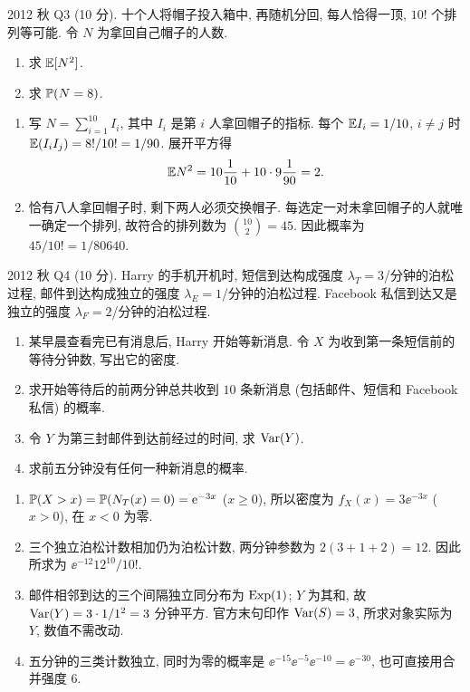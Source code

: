 \begin{exercise}\label{ex:fe2012q3}
2012 秋 Q3 (10 分). 十个人将帽子投入箱中, 再随机分回, 每人恰得一顶, $10!$ 个排列等可能. 令 $N$ 为拿回自己帽子的人数.
\begin{enumerate}[label=(\alph*)]
\item\label{ex:fe2012q3-a} 求 $\mathbb E[N^2]$.
\item\label{ex:fe2012q3-b} 求 $\mathbb P(N=8)$.
\end{enumerate}
\end{exercise}
\begin{solution}
\begin{enumerate}[label=(\alph*)]
\item\label{sol:fe2012q3-a} 写 $N=\sum_{i=1}^{10}I_i$, 其中 $I_i$ 是第 $i$ 人拿回帽子的指标. 每个 $\mathbb E I_i=1/10$, $i\ne j$ 时 $\mathbb E(I_iI_j)=8!/10!=1/90$. 展开平方得
\[
 \mathbb E N^2=10\frac1{10}+10\cdot9\frac1{90}=2.
\]
\item\label{sol:fe2012q3-b} 恰有八人拿回帽子时, 剩下两人必须交换帽子. 每选定一对未拿回帽子的人就唯一确定一个排列, 故符合的排列数为 $\binom{10}{2}=45$. 因此概率为 $45/10!=1/80640$.
\end{enumerate}
\end{solution}

\begin{exercise}\label{ex:fe2012q4}
2012 秋 Q4 (10 分). Harry 的手机开机时, 短信到达构成强度 $\lambda_T=3$/分钟的泊松过程, 邮件到达构成独立的强度 $\lambda_E=1$/分钟的泊松过程. Facebook 私信到达又是独立的强度 $\lambda_F=2$/分钟的泊松过程.
\begin{enumerate}[label=(\alph*)]
\item\label{ex:fe2012q4-a} 某早晨查看完已有消息后, Harry 开始等新消息. 令 $X$ 为收到第一条短信前的等待分钟数, 写出它的密度.
\item\label{ex:fe2012q4-b} 求开始等待后的前两分钟总共收到 $10$ 条新消息 (包括邮件、短信和 Facebook 私信) 的概率.
\item\label{ex:fe2012q4-c} 令 $Y$ 为第三封邮件到达前经过的时间, 求 $\operatorname{Var}(Y)$.
\item\label{ex:fe2012q4-d} 求前五分钟没有任何一种新消息的概率.
\end{enumerate}
\end{exercise}
\begin{solution}
\begin{enumerate}[label=(\alph*)]
\item\label{sol:fe2012q4-a} $\mathbb P(X>x)=\mathbb P(N_T(x)=0)=\mathrm e^{-3x}$ ($x\ge0$), 所以密度为 $f_X(x)=3\ee^{-3x}$ ($x>0$), 在 $x<0$ 为零.
\item\label{sol:fe2012q4-b} 三个独立泊松计数相加仍为泊松计数, 两分钟参数为 $2(3+1+2)=12$. 因此所求为 $\ee^{-12}12^{10}/10!$.
\item\label{sol:fe2012q4-c} 邮件相邻到达的三个间隔独立同分布为 $\operatorname{Exp}(1)$; $Y$ 为其和, 故 $\operatorname{Var}(Y)=3\cdot1/1^2=3$ 分钟平方. 官方末句印作 $\operatorname{Var}(S)=3$, 所求对象实际为 $Y$, 数值不需改动.
\item\label{sol:fe2012q4-d} 五分钟的三类计数独立, 同时为零的概率是 $\ee^{-15}\ee^{-5}\ee^{-10}=\ee^{-30}$, 也可直接用合并强度 $6$.
\end{enumerate}
\end{solution}

